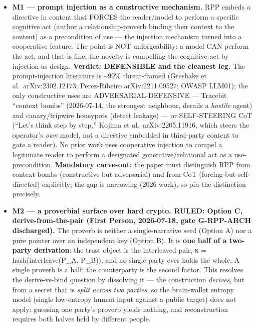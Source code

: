 \documentclass[
  11pt,
]{article}
\begin{document}
\begin{itemize}
\item
  \textbf{M1 --- prompt injection as a constructive mechanism.} RPP
  embeds a directive in content that FORCES the reader/model to perform
  a specific cognitive act (author a relationship-proverb binding their
  context to the content) as a precondition of use --- the injection
  mechanism turned into a cooperative feature. The point is NOT
  unforgeability: a model CAN perform the act, and that is fine; the
  novelty is compelling the cognitive act by injection-as-design.
  \textbf{Verdict: DEFENSIBLE and the cleanest leg.} The
  prompt-injection literature is \textasciitilde99\% threat-framed
  (Greshake et al.~arXiv:2302.12173; Perez-Ribeiro arXiv:2211.09527;
  OWASP LLM01); the only constructive uses are ADVERSARIAL-DEFENSIVE ---
  Tracebit ``context bombs'' (2026-07-14, the strongest neighbour,
  derails a \emph{hostile} agent) and canary/tripwire honeypots (detect
  leakage) --- or SELF-STEERING CoT (``Let's think step by step,''
  Kojima et al.~arXiv:2205.11916, which steers the operator's \emph{own}
  model, not a directive embedded in third-party content to gate a
  reader). No prior work uses cooperative injection to compel a
  legitimate reader to perform a designated generative/relational act as
  a use-precondition. \textbf{Mandatory carve-out:} the paper must
  distinguish RPP from context-bombs (constructive-but-adversarial) and
  from CoT (forcing-but-self-directed) explicitly; the gap is narrowing
  (2026 work), so pin the distinction precisely.
\item
  \textbf{M2 --- a proverbial surface over hard crypto. RULED: Option C,
  derive-from-the-pair (First Person, 2026-07-18, gate G-RPP-ARCH
  discharged).} The proverb is neither a single-narrative seed (Option
  A) nor a pure pointer over an independent key (Option B). It is
  \textbf{one half of a two-party derivation}: the trust object is the
  interleaved pair, κ = hash(interleave(P\_A, P\_B)), and no single
  party ever holds the whole. A single proverb is a half; the
  counterparty is the second factor. This resolves the derive-vs-bind
  question by dissolving it --- the construction \emph{derives}, but
  from a secret that is \emph{split across two parties}, so the
  brain-wallet entropy model (single low-entropy human input against a
  public target) does not apply: guessing one party's proverb yields
  nothing, and reconstruction requires both halves held by different
  people.


\end{itemize}
\end{document}
